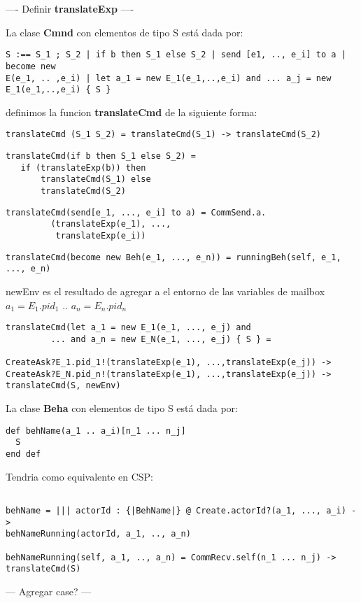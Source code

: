 \documentclass[fleqn]{article}
\begin{document}
---- Definir \textbf{translateExp}  ----

La clase \textbf{Cmnd} con elementos de tipo S está dada por:

\begin{verbatim}
S :== S_1 ; S_2 | if b then S_1 else S_2 | send [e1, .., e_i] to a | become new
E(e_1, .. ,e_i) | let a_1 = new E_1(e_1,..,e_i) and ... a_j = new
E_1(e_1,..,e_i) { S } 
\end{verbatim}

definimos la funcion \textbf{translateCmd} de la siguiente forma:

\begin{verbatim}
translateCmd (S_1 S_2) = translateCmd(S_1) -> translateCmd(S_2)
\end{verbatim}


\begin{verbatim}
translateCmd(if b then S_1 else S_2) = 
   if (translateExp(b)) then
       translateCmd(S_1) else 
       translateCmd(S_2)
\end{verbatim}

\begin{verbatim}
translateCmd(send[e_1, ..., e_i] to a) = CommSend.a.
         (translateExp(e_1), ..., 
          translateExp(e_i)) 
\end{verbatim}

\begin{verbatim}
translateCmd(become new Beh(e_1, ..., e_n)) = runningBeh(self, e_1, ..., e_n)
\end{verbatim}

newEnv es el resultado de agregar a el entorno de las variables de mailbox $a_1
= E_1.pid_1$ .. $a_n = E_n.pid_n$
\begin{verbatim}
translateCmd(let a_1 = new E_1(e_1, ..., e_j) and 
         ... and a_n = new E_N(e_1, ..., e_j) { S } = 

CreateAsk?E_1.pid_1!(translateExp(e_1), ...,translateExp(e_j)) ->
CreateAsk?E_N.pid_n!(translateExp(e_1), ...,translateExp(e_j)) ->
translateCmd(S, newEnv)
\end{verbatim}


La clase \textbf{Beha} con elementos de tipo S está dada por:

\begin{verbatim}
def behName(a_1 .. a_i)[n_1 ... n_j]
  S
end def
\end{verbatim}

Tendria como equivalente en CSP:

\begin{verbatim}

behName = ||| actorId : {|BehName|} @ Create.actorId?(a_1, ..., a_i) ->
behNameRunning(actorId, a_1, .., a_n)

behNameRunning(self, a_1, .., a_n) = CommRecv.self(n_1 ... n_j) -> translateCmd(S)

\end{verbatim}

--- Agregar case? ---


{}

\end{document}
